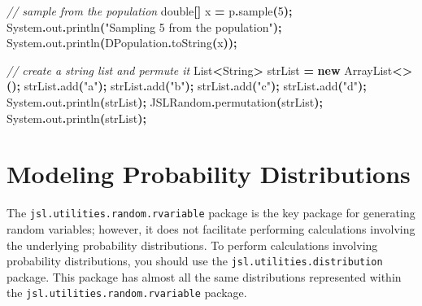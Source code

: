 \documentclass[
]{book}
\newenvironment{Shaded}{\begin{snugshade}}{\end{snugshade}}
\newcommand{\BuiltInTok}[1]{#1}
\newcommand{\CommentTok}[1]{\textcolor[rgb]{0.56,0.35,0.01}{\textit{#1}}}
\newcommand{\DataTypeTok}[1]{\textcolor[rgb]{0.13,0.29,0.53}{#1}}
\newcommand{\DecValTok}[1]{\textcolor[rgb]{0.00,0.00,0.81}{#1}}
\newcommand{\FunctionTok}[1]{\textcolor[rgb]{0.00,0.00,0.00}{#1}}
\newcommand{\KeywordTok}[1]{\textcolor[rgb]{0.13,0.29,0.53}{\textbf{#1}}}
\newcommand{\NormalTok}[1]{#1}
\newcommand{\OperatorTok}[1]{\textcolor[rgb]{0.81,0.36,0.00}{\textbf{#1}}}
\newcommand{\StringTok}[1]{\textcolor[rgb]{0.31,0.60,0.02}{#1}}
\theoremstyle{definition}
\theoremstyle{definition}
\theoremstyle{definition}
\theoremstyle{definition}
\theoremstyle{remark}
\begin{document}
\begin{Shaded}
\begin{Highlighting}[]
\CommentTok{// sample from the population}
\DataTypeTok{double}\OperatorTok{[]}\NormalTok{ x }\OperatorTok{=}\NormalTok{ p}\OperatorTok{.}\FunctionTok{sample}\OperatorTok{(}\DecValTok{5}\OperatorTok{);}
\BuiltInTok{System}\OperatorTok{.}\FunctionTok{out}\OperatorTok{.}\FunctionTok{println}\OperatorTok{(}\StringTok{"Sampling 5 from the population"}\OperatorTok{);}
\BuiltInTok{System}\OperatorTok{.}\FunctionTok{out}\OperatorTok{.}\FunctionTok{println}\OperatorTok{(}\NormalTok{DPopulation}\OperatorTok{.}\FunctionTok{toString}\OperatorTok{(}\NormalTok{x}\OperatorTok{));}

\CommentTok{// create a string list and permute it}
\BuiltInTok{List}\OperatorTok{\textless{}}\BuiltInTok{String}\OperatorTok{\textgreater{}}\NormalTok{ strList }\OperatorTok{=} \KeywordTok{new} \BuiltInTok{ArrayList}\OperatorTok{\textless{}\textgreater{}();}
\NormalTok{strList}\OperatorTok{.}\FunctionTok{add}\OperatorTok{(}\StringTok{"a"}\OperatorTok{);}
\NormalTok{strList}\OperatorTok{.}\FunctionTok{add}\OperatorTok{(}\StringTok{"b"}\OperatorTok{);}
\NormalTok{strList}\OperatorTok{.}\FunctionTok{add}\OperatorTok{(}\StringTok{"c"}\OperatorTok{);}
\NormalTok{strList}\OperatorTok{.}\FunctionTok{add}\OperatorTok{(}\StringTok{"d"}\OperatorTok{);}
\BuiltInTok{System}\OperatorTok{.}\FunctionTok{out}\OperatorTok{.}\FunctionTok{println}\OperatorTok{(}\NormalTok{strList}\OperatorTok{);}
\NormalTok{JSLRandom}\OperatorTok{.}\FunctionTok{permutation}\OperatorTok{(}\NormalTok{strList}\OperatorTok{);}
\BuiltInTok{System}\OperatorTok{.}\FunctionTok{out}\OperatorTok{.}\FunctionTok{println}\OperatorTok{(}\NormalTok{strList}\OperatorTok{);}
\end{Highlighting}
\end{Shaded}

\hypertarget{modeling-probability-distributions}{%
\section{Modeling Probability Distributions}\label{modeling-probability-distributions}}

The \texttt{jsl.utilities.random.rvariable} package is the key package for generating random variables; however, it does not facilitate performing calculations involving the underlying probability distributions. To perform calculations involving probability distributions, you should use the \texttt{jsl.utilities.distribution} package. This package has almost all the same distributions represented within the \texttt{jsl.utilities.random.rvariable} package.
\end{document}
